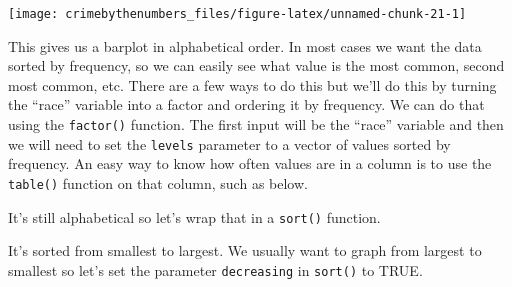 \documentclass[
  12pt,
]{book}
\newenvironment{Shaded}{\begin{snugshade}}{\end{snugshade}}
\newcommand{\AttributeTok}[1]{\textcolor[rgb]{0.61,0.61,0.61}{#1}}
\newcommand{\CommentTok}[1]{\textcolor[rgb]{0.37,0.37,0.37}{\textit{#1}}}
\newcommand{\ConstantTok}[1]{\textcolor[rgb]{0,0,0}{#1}}
\newcommand{\FunctionTok}[1]{\textcolor[rgb]{0,0,0}{#1}}
\newcommand{\NormalTok}[1]{#1}
\newcommand{\SpecialCharTok}[1]{\textcolor[rgb]{0,0,0}{#1}}
\begin{document}
\begin{center}\texttt{[image: crimebythenumbers\_files/figure-latex/unnamed-chunk-21-1]} \end{center}

This gives us a barplot in alphabetical order. In most cases we want the data sorted by frequency, so we can easily see what value is the most common, second most common, etc. There are a few ways to do this but we'll do this by turning the ``race'' variable into a factor and ordering it by frequency. We can do that using the \texttt{factor()} function. The first input will be the ``race'' variable and then we will need to set the \texttt{levels} parameter to a vector of values sorted by frequency. An easy way to know how often values are in a column is to use the \texttt{table()} function on that column, such as below.

\begin{Shaded}
\end{Shaded}

It's still alphabetical so let's wrap that in a \texttt{sort()} function.

\begin{Shaded}
\end{Shaded}

It's sorted from smallest to largest. We usually want to graph from largest to smallest so let's set the parameter \texttt{decreasing} in \texttt{sort()} to TRUE.

\begin{Shaded}
\end{Shaded}
\end{document}
